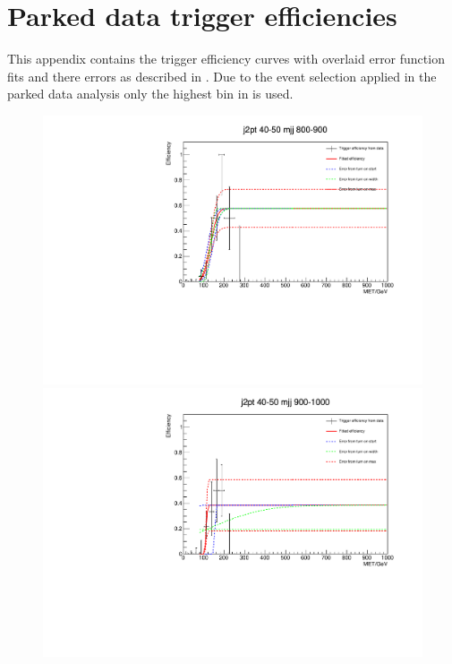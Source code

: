 \chapter{Parked data trigger efficiencies}
\label{app:trigeffs}
This appendix contains the trigger efficiency curves with overlaid error function fits and there errors as described in . Due to the event selection applied in the parked data analysis only the highest bin in \Mjj is used.

\begin{figure}[h!]
  \begin{center}
    \includegraphics[width=.6\largefigwidth]{plots/parked/trigfitplots/hData_MET_1D_23A.pdf}
    \includegraphics[width=.6\largefigwidth]{plots/parked/trigfitplots/hData_MET_1D_24A.pdf}


\end{center}
\end{figure}
